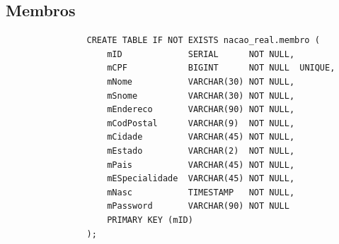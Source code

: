 \documentclass[11pt]{article}
\begin{document}
        \subsection{Membros}
            \begin{lstlisting}
                CREATE TABLE IF NOT EXISTS nacao_real.membro (
                    mID             SERIAL      NOT NULL,
                    mCPF            BIGINT      NOT NULL  UNIQUE,
                    mNome           VARCHAR(30) NOT NULL,
                    mSnome          VARCHAR(30) NOT NULL,
                    mEndereco       VARCHAR(90) NOT NULL,
                    mCodPostal      VARCHAR(9)  NOT NULL,
                    mCidade         VARCHAR(45) NOT NULL,
                    mEstado         VARCHAR(2)  NOT NULL,
                    mPais           VARCHAR(45) NOT NULL,
                    mESpecialidade  VARCHAR(45) NOT NULL,
                    mNasc           TIMESTAMP   NOT NULL,
                    mPassword       VARCHAR(90) NOT NULL
                    PRIMARY KEY (mID)
                );
            \end{lstlisting}
\end{document}

